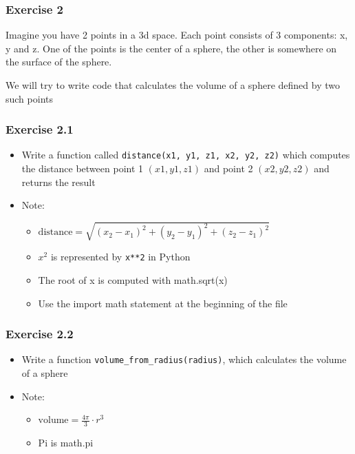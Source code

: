 \documentclass[10pt, a4paper]{beamer} %
\begin{document}
{\begin{frame}
\end{frame}

\begin{frame}[c, fragile]\frametitle{Exercise 2}

	Imagine you have 2 points in a 3d space.
	Each point consists of 3 components: x, y and z.
	One of the points is the center of a sphere, the other is somewhere on the surface of the sphere.

	We will try to write code that calculates the volume of a sphere defined by two
	such points
\end{frame}
\begin{frame}[c, fragile]\frametitle{Exercise 2.1}
	\begin{itemize}
		\item Write a function called \texttt{distance(x1, y1, z1, x2, y2, z2)} which computes the distance between point 1 $(x1, y1, z1)$ and point 2 $(x2, y2, z2)$ and returns the result
		\item Note:
		      \begin{itemize}
			      \item \( \text{distance} = \sqrt{\left(x_2 - x_1\right)^2 + \left(y_2 - y_1\right)^2 + \left(z_2 - z_1\right)^2} \)
			      \item $x^2$ is represented by \texttt{x**2} in Python
			      \item The root of x is computed with math.sqrt(x)
			      \item Use the import math statement at the beginning of the file
		      \end{itemize}
	\end{itemize}
\end{frame}

\begin{frame}[c, fragile]\frametitle{Exercise 2.2}
	\begin{itemize}
		\item Write a function \texttt{volume\_from\_radius(radius)}, which calculates the
		      volume of a sphere
		\item Note:
		      \begin{itemize}
			      \item \( \text{volume} = \frac{4\pi}{3}\cdot r^3\)
			      \item Pi is math.pi
		      \end{itemize}
	\end{itemize}

\end{frame}


}
\end{document}
